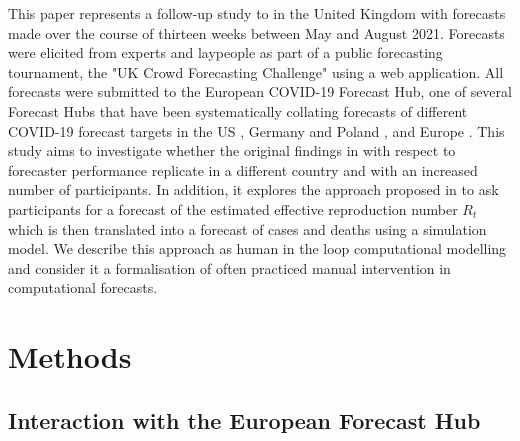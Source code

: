 \documentclass[10pt,a4paper,twocolumn]{article}
\begin{document}
This paper represents a follow-up study to \citet{bosseComparingHumanModelbased2022} in the United Kingdom with forecasts made over the course of thirteen weeks between May and August 2021. Forecasts were elicited from experts and laypeople as part of a public forecasting tournament, the "UK Crowd Forecasting Challenge" using a web application. All forecasts were submitted to the European COVID-19 Forecast Hub, one of several Forecast Hubs that have been systematically collating forecasts of different COVID-19 forecast targets in the US \citep{cramerEvaluationIndividualEnsemble2021}, Germany and Poland \citep{bracherShorttermForecastingCOVID192021, bracherNationalSubnationalShortterm2021}, and Europe \citep{sherrattPredictivePerformanceMultimodel2022a}. This study aims to investigate whether the original findings in \citet{bosseComparingHumanModelbased2022} with respect to forecaster performance replicate in a different country and with an increased number of participants. In addition, it explores the approach proposed in \citet{bosseComparingHumanModelbased2022} to ask participants for a forecast of the estimated effective reproduction number $R_t$ which is then translated into a forecast of cases and deaths using a simulation model. We describe this approach as human in the loop computational modelling and consider it a formalisation of often practiced manual intervention in computational forecasts.


\section*{Methods}

\subsection*{Interaction with the European Forecast Hub}
\end{document}
